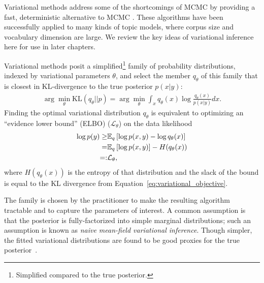 Variational methods address some of the shortcomings of MCMC by
providing a fast, deterministic alternative to MCMC
\citep{jordan:2003,jordan:1999}. These algorithms have been
successfully applied to many kinds of topic models, where corpus size
and vocabulary dimension are large.  We review the key ideas of
variational inference here for use in later chapters.

Variational methods posit a simplified\footnote{Simplified compared to
  the true posterior.} family of probability distributions, indexed by
variational parameters $\theta$, and select the member $q_{\theta}$ of
this family that is closest in KL-divergence to the true posterior
$p(x | y)$:
\begin{align}
  \arg \min_{\theta} \mbox{KL}(q_{\theta} || p) = \arg \min_{{\theta}} \int_x q_{\theta}(x) \log \frac{q_{\theta}(x)}{p(x | y)} dx.
  \label{eq:variational_objective}
\end{align}
Finding the optimal variational distribution $q_\theta$ is equivalent
to optimizing an ``evidence lower bound'' (ELBO) ($\mathcal{L}_\theta$) on
the data likelihood
\begin{eqnarray}
  \log p(y) \ge & \mathbb{E}_q\left[\log p(x, y) - \log q_\theta(x)\right] \\
  = & \mathbb{E}_q\left[\log p(x, y)\right] - H(q_\theta(x)) \\
  =: & \mathcal{L}_\theta,
  \label{eq:traditional_variational_objective}
\end{eqnarray}
where $H(q_\theta(x))$ is the entropy of that distribution and the
slack of the bound is equal to the KL divergence from
Equation~\ref{eq:variational_objective}.

The family is chosen by the practitioner to make the resulting
algorithm tractable and to capture the parameters of interest. A
common assumption is that the posterior is fully-factorized into
simple marginal distributions; such an assumption is known as
\emph{naive mean-field variational inference}. Though simpler, the
fitted variational distributions are found to be good proxies for the
true posterior~\citep{jordan:1999,gerrish:2011}.


